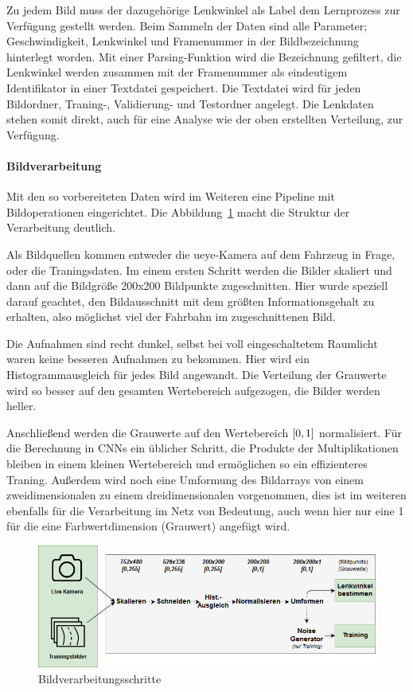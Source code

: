 Zu jedem Bild muss der dazugehörige Lenkwinkel als Label dem Lernprozess zur Verfügung gestellt werden. Beim Sammeln der Daten sind alle Parameter; Geschwindigkeit, Lenkwinkel und Framenummer in der Bildbezeichnung hinterlegt worden. Mit einer Parsing-Funktion wird die Bezeichnung gefiltert, die Lenkwinkel werden zusammen mit der Framenummer als eindeutigem Identifikator in einer Textdatei gespeichert. Die Textdatei wird für jeden Bildordner, Traning-, Validierung- und Testordner angelegt. Die Lenkdaten stehen somit direkt, auch für eine Analyse wie der oben erstellten Verteilung, zur Verfügung.

\paragraph{Bildverarbeitung}
Mit den so vorbereiteten Daten wird im Weiteren eine Pipeline mit Bildoperationen eingerichtet. Die Abbildung~\ref{fig:dronetfrozen} macht die Struktur der Verarbeitung deutlich.

Als Bildquellen kommen entweder die ueye-Kamera auf dem Fahrzeug in Frage, oder die Traningsdaten. Im einem ersten Schritt werden die Bilder skaliert und dann auf die Bildgröße 200x200 Bildpunkte zugeschnitten. Hier wurde speziell darauf geachtet, den Bildausschnitt mit dem größten Informationsgehalt zu erhalten, also möglichst viel der Fahrbahn im zugeschnittenen Bild.

Die Aufnahmen sind recht dunkel, selbst bei voll eingeschaltetem Raumlicht waren keine besseren Aufnahmen zu bekommen. Hier wird ein Histogrammausgleich für jedes Bild angewandt. Die Verteilung der Grauwerte wird so besser auf den gesamten Wertebereich aufgezogen, die Bilder werden heller.

Anschließend werden die Grauwerte auf den Wertebereich $\interval{0}{1}$ normalisiert. Für die Berechnung in CNNs ein üblicher Schritt, die Produkte der Multiplikationen bleiben in einem kleinen Wertebereich und ermöglichen so ein effizienteres Traning. Außerdem wird noch eine Umformung des Bildarrays von einem zweidimensionalen zu einem dreidimensionalen vorgenommen, dies ist im weiteren ebenfalls für die Verarbeitung im Netz von Bedeutung, auch wenn hier nur eine 1 für die eine Farbwertdimension (Grauwert) angefügt wird.

\begin{figure}[h]
	\centering
	\includegraphics[scale=0.56]{figures/Pipeline.png}
	\caption{Bildverarbeitungsschritte}
	\label{fig:dronetfrozen}
\end{figure}

